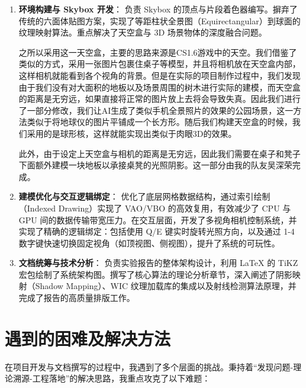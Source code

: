 \documentclass[a4paper]{article}
\begin{document}
\begin{enumerate}
    \item \textbf{环境构建与 Skybox 开发}：
    负责 Skybox 的顶点与片段着色器编写。摒弃了传统的六面体贴图方案，实现了等距柱状全景图（Equirectangular）到球面的纹理映射算法。重点解决了天空盒与 3D 场景物体的深度融合问题。

    之所以采用这一天空盒，主要的思路来源是CS1.6游戏中的天空。我们借鉴了类似的方式，采用一张图片包裹住桌子等模型，并且将相机放在天空盒内部，这样相机就能看到各个视角的背景。但是在实际的项目制作过程中，我们发现由于我们没有对大面积的地板以及场景周围的树木进行实际的建模，而天空盒的距离是无穷远，如果直接将正常的图片放上去将会导致失真。因此我们进行了一部分修改，我们让AI生成了类似手机全景照片的效果的公园场景，这一方法类似于将地球仪的图片平铺成一个长方形。随后我们构建天空盒的时候，我们采用的是球形核，这样就能实现出类似于肉眼3D的效果。

	此外，由于设定上天空盒与相机的距离是无穷远，因此我们需要在桌子和凳子下面额外建模一块地板以承接桌凳的光照阴影。这一部分由我的队友吴深荣完成。

    \item \textbf{建模优化与交互逻辑绑定}：
    优化了底层网格数据结构，通过索引绘制（Indexed Drawing）实现了 VAO/VBO 的高效复用，有效减少了 CPU 与 GPU 间的数据传输带宽压力。在交互层面，开发了多视角相机控制系统，并实现了精确的逻辑绑定：包括使用 Q/E 键实时旋转光照方向，以及通过 1-4 数字键快速切换固定视角（如顶视图、侧视图），提升了系统的可玩性。

    \item \textbf{文档统筹与技术分析}：
    负责实验报告的整体架构设计，利用 \LaTeX{} 的 TiKZ 宏包绘制了系统架构图。撰写了核心算法的理论分析章节，深入阐述了阴影映射（Shadow Mapping）、WIC 纹理加载库的集成以及射线检测算法原理，并完成了报告的高质量排版工作。
\end{enumerate}

\section{遇到的困难及解决方法}

在项目开发与文档撰写的过程中，我遇到了多个层面的挑战。秉持着“发现问题-理论溯源-工程落地”的解决思路，我重点攻克了以下难题：
\end{document}
